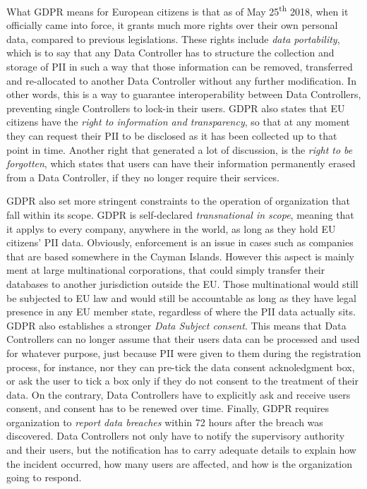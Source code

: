 What GDPR means for European citizens is that as of May 25\textsuperscript{th}
2018, when it officially came into force, it grants much more rights over their
own personal data, compared to previous legislations. These rights include
\emph{data portability}, which is to say that any Data Controller has to
structure the collection and storage of PII in such a way that those information
can be removed, transferred and re-allocated to another Data Controller without
any further modification. In other words, this is a way to guarantee
interoperability between Data Controllers, preventing single Controllers to
lock-in their users. GDPR also states that EU citizens have the \emph{right to
information and transparency}, so that at any moment they can request their PII
to be disclosed as it has been collected up to that point in time. Another right
that generated a lot of discussion, is the \emph{right to be forgotten}, which
states that users can have their information permanently erased from a Data
Controller, if they no longer require their services.

GDPR also set more stringent constraints to the operation of organization
that fall within its scope. GDPR is self-declared \emph{transnational in scope},
meaning that it applys to every company, anywhere in the world, as long as they hold EU
citizens' PII data. Obviously, enforcement is an issue in cases such as
companies that are based somewhere in the Cayman Islands. However this aspect is
mainly ment at large multinational corporations, that could simply
transfer their databases to another jurisdiction outside the EU. Those
multinational would still be subjected to EU law and would still be
accountable as long as they have legal presence in any EU member state,
regardless of where the PII data actually sits. GDPR also establishes a stronger
\emph{Data Subject consent}. This means that Data Controllers can no longer
assume that their users data can be processed and used for whatever purpose,
just because PII were given to them during the registration process, for
instance, nor they can pre-tick the data consent acknoledgment box, or ask the
user to tick a box only if they do not consent to the treatment of their data.
On the contrary, Data Controllers have to explicitly ask and receive users
consent, and consent has to be renewed over time. Finally, GDPR requires
organization to \emph{report data breaches} within 72 hours after the breach was
discovered. Data Controllers not only have to notify the supervisory authority
and their users, but the notification has to carry adequate details to explain
how the incident occurred, how many users are affected, and how is the
organization going to respond.

